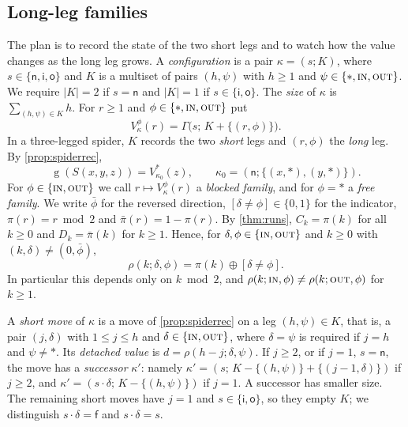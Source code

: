 \documentclass[11pt]{amsart}
\theoremstyle{definition}
\theoremstyle{remark}
\newcommand{\gv}{\operatorname{g}}           %
\newcommand{\sn}{\mathsf{n}}
\newcommand{\si}{\mathsf{i}}
\newcommand{\so}{\mathsf{o}}
\newcommand{\sff}{\mathsf{f}}
\newcommand{\Sp}{S}
\newcommand{\free}{\ast}
\newcommand{\IN}{\textup{\textsc{in}}}
\newcommand{\OUT}{\textup{\textsc{out}}}
\begin{document}
\subsection{Long-leg families}
The plan is to record the state of the two short legs and to watch how the value changes as the long leg grows. A \emph{configuration} is a pair $\kappa=(s;K)$, where $s\in\{\sn,\si,\so\}$ and $K$ is a multiset of pairs $(h,\psi)$ with $h\ge1$ and $\psi\in\{\free,\IN,\OUT\}$. We require $|K|=2$ if $s=\sn$ and $|K|=1$ if $s\in\{\si,\so\}$. The \emph{size} of $\kappa$ is $\sum_{(h,\psi)\in K}h$. For $r\ge1$ and $\phi\in\{\free,\IN,\OUT\}$ put
\[
  V_\kappa^\phi(r)=\Gamma\bigl(s;\,K+\{(r,\phi)\}\bigr).
\]
In a three-legged spider, $K$ records the two \emph{short} legs and $(r,\phi)$ the \emph{long} leg. By \cref{prop:spiderrec},
\begin{equation}\label{eq:gk0}
  \gv(\Sp(x,y,z))=V_{\kappa_0}^{\free}(z),\qquad \kappa_0=(\sn;\{(x,\free),(y,\free)\}).
\end{equation}
For $\phi\in\{\IN,\OUT\}$ we call $r\mapsto V^\phi_\kappa(r)$ a \emph{blocked family}, and for $\phi=\free$ a \emph{free family}. We write $\bar\phi$ for the reversed direction, $[\delta\ne\phi]\in\{0,1\}$ for the indicator, $\pi(r)=r\bmod 2$ and $\bar\pi(r)=1-\pi(r)$. By \cref{thm:runs}, $C_k=\pi(k)$ for all $k\ge0$ and $D_k=\bar\pi(k)$ for $k\ge1$. Hence, for $\delta,\phi\in\{\IN,\OUT\}$ and $k\ge0$ with $(k,\delta)\ne(0,\bar\phi)$,
\begin{equation}\label{eq:beta}
  \rho(k;\delta,\phi)=\pi(k)\oplus[\delta\ne\phi].
\end{equation}
In particular this depends only on $k\bmod 2$, and $\rho(k;\IN,\phi)\ne\rho(k;\OUT,\phi)$ for $k\ge1$.

A \emph{short move} of $\kappa$ is a move of \cref{prop:spiderrec} on a leg $(h,\psi)\in K$, that is, a pair $(j,\delta)$ with $1\le j\le h$ and $\delta\in\{\IN,\OUT\}$, where $\delta=\psi$ is required if $j=h$ and $\psi\ne\free$. Its \emph{detached value} is $d=\rho(h-j;\delta,\psi)$. If $j\ge2$, or if $j=1$, $s=\sn$, the move has a \emph{successor} $\kappa'$: namely $\kappa'=(s;\,K-\{(h,\psi)\}+\{(j-1,\delta)\})$ if $j\ge2$, and $\kappa'=(s\cdot\delta;\,K-\{(h,\psi)\})$ if $j=1$. A successor has smaller size. The remaining short moves have $j=1$ and $s\in\{\si,\so\}$, so they empty $K$; we distinguish $s\cdot\delta=\sff$ and $s\cdot\delta=s$.
\end{document}
